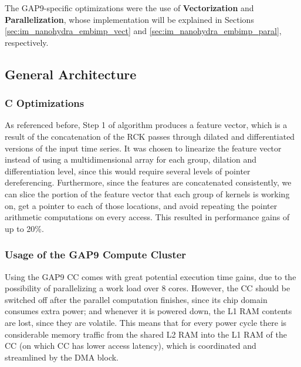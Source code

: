         The GAP9-specific optimizations were the use of \textbf{Vectorization} and \textbf{Parallelization}, whose implementation will be explained in Sections \ref{sec:im_nanohydra_embimp_vect} and \ref{sec:im_nanohydra_embimp_paral}, respectively.

        \subsection{General Architecture}\label{sec:im_nanohydra_embimp_genopt}

        \subsubsection{C Optimizations}
        As referenced before, Step 1 of algorithm produces a feature vector, which is a result of the concatenation of the RCK passes through dilated and differentiated versions of the input time series. It was chosen to linearize
        the feature vector instead of using a multidimensional array for each group, dilation and differentiation level, since this would require several levels of pointer dereferencing. Furthermore, since the features are concatenated consistently, 
        we can slice the portion of the feature vector that each group of kernels is working on, get a pointer to each of those locations, and avoid repeating the pointer arithmetic computations on every access. This resulted
        in performance gains of up to 20\%.

        \subsubsection{Usage of the GAP9 Compute Cluster}\label{sec:im_nanohydra_usage_cc}
        Using the GAP9 CC comes with great potential execution time gains, due to the possibility of parallelizing a work load over 8 cores. However, the CC should be switched off after the parallel computation finishes, since
        its chip domain consumes extra power; and whenever it is powered down, the L1 RAM contents are lost, since they are volatile. This means that for every power cycle there is considerable memory traffic from the shared L2 RAM into
        the L1 RAM of the CC (on which CC has lower access latency), which is coordinated and streamlined by the DMA block.

